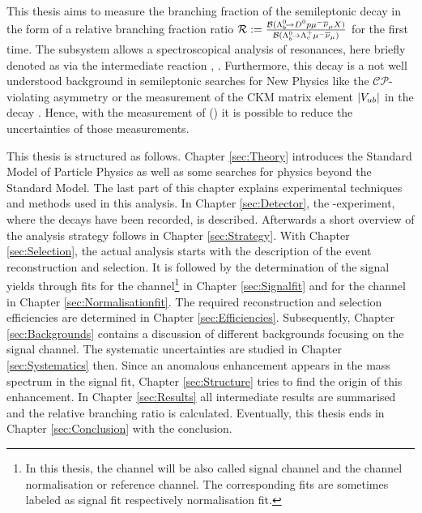 This thesis aims to measure the branching fraction of the semileptonic decay \LbToDpmunuX in the form of a relative branching fraction ratio $\mathcal{R} := \frac{{\cal B}({{\Lambda}^0_{b}}\!\rightarrow {\ensuremath{{D}^0}}{\ensuremath{p}}{\ensuremath{\mu^-}}{\ensuremath{{\overline{\nu}}_\mu}} X)}{{\cal B}({{\Lambda}^0_{b}}\!\rightarrow {\ensuremath{{\Lambda}^+_{c}}}{\ensuremath{\mu^-}}{\ensuremath{{\overline{\nu}}_\mu}})}$ for the first time.
The \Dz\proton subsystem allows a spectroscopical analysis of \Lc resonances, here briefly denoted as \Lcstar via the intermediate reaction \decay{\Lb}{\Lcstar\mun\neumb}, \decay{\Lcstar}{\Dz\proton}.
Furthermore, this decay is a not well understood background in semileptonic searches for New Physics like the $\mathcal{CP}$-violating asymmetry \asld \cite{asld} or the measurement of the CKM matrix element $|{V_{{u}{b}}}|$ in the decay \decay{\Lb}{\proton\mun\neumb} \cite{SL_Vub}.
Hence, with the measurement of \BR(\LbToDpmunuX) it is possible to reduce the uncertainties of those measurements.

This thesis is structured as follows.
Chapter \ref{sec:Theory} introduces the Standard Model of Particle Physics as well as some searches for physics beyond the Standard Model. The last part of this chapter explains experimental techniques and methods used in this analysis.
In Chapter \ref{sec:Detector}, the \lhcb-experiment, where the decays have been recorded, is described.
Afterwards a short overview of the analysis strategy follows in Chapter \ref{sec:Strategy}.
With Chapter \ref{sec:Selection}, the actual analysis starts with the description of the event reconstruction and selection.
It is followed by the determination of the signal yields through fits for the \LbToDpmunuX channel\footnote{In this thesis, the channel \LbToDpmunuX will be also called signal channel and the \LbToLcmunu channel normalisation or reference channel. The corresponding fits are sometimes labeled as signal fit respectively normalisation fit.}
in Chapter \ref{sec:Signalfit} and for the \LbToLcmunu channel in Chapter \ref{sec:Normalisationfit}.
The required reconstruction and selection efficiencies are determined in Chapter \ref{sec:Efficiencies}.
Subsequently, Chapter \ref{sec:Backgrounds} contains a discussion of different backgrounds focusing on the \LbToDpmunuX signal channel.
The systematic uncertainties are studied in Chapter \ref{sec:Systematics} then.
Since an anomalous enhancement appears in the \Dz\proton mass spectrum in the signal fit, Chapter \ref{sec:Structure} tries to find the origin of this enhancement.
In Chapter \ref{sec:Results} all intermediate results are summarised and the relative branching ratio \R is calculated.
Eventually, this thesis ends in Chapter \ref{sec:Conclusion} with the conclusion.

